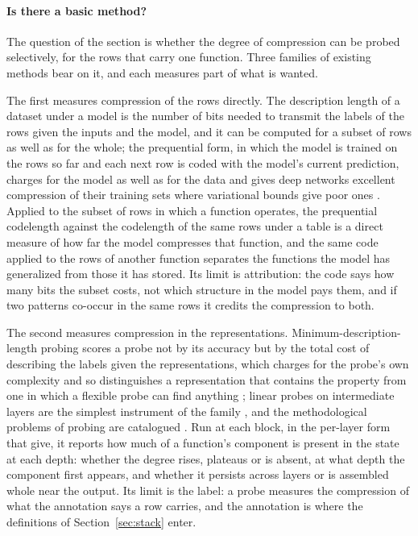\paragraph{Is there a basic method?}
The question of the section is whether the degree of compression can be probed selectively, for the
rows that carry one function. Three families of existing methods bear on it, and each measures part of
what is wanted.

The first measures compression of the rows directly. The description length of a dataset under a
model is the number of bits needed to transmit the labels of the rows given the inputs and the model,
and it can be computed for a subset of rows as well as for the whole; the prequential form, in which
the model is trained on the rows so far and each next row is coded with the model's current
prediction, charges for the model as well as for the data and gives deep networks excellent
compression of their training sets where variational bounds give poor ones \citep{blier2018}. Applied
to the subset of rows in which a function operates, the prequential codelength against the codelength
of the same rows under a table is a direct measure of how far the model compresses that function, and
the same code applied to the rows of another function separates the functions the model has
generalized from those it has stored. Its limit is attribution: the code says how many bits the
subset costs, not which structure in the model pays them, and if two patterns co-occur in the same
rows it credits the compression to both.

The second measures compression in the representations. Minimum-description-length probing scores a
probe not by its accuracy but by the total cost of describing the labels given the representations,
which charges for the probe's own complexity and so distinguishes a representation that contains the
property from one in which a flexible probe can find anything \citep{voita2020}; linear probes on
intermediate layers are the simplest instrument of the family \citep{alain2016}, and the
methodological problems of probing are catalogued \citep{belinkov2022}. Run at each block, in the
per-layer form that \citet{voita2020} give, it reports how much of a function's component is present
in the state at each depth: whether the degree rises, plateaus or is absent, at what depth the
component first appears, and whether it persists across layers or is assembled whole near the output.
Its limit is the label: a probe measures the compression of what the annotation says a row carries,
and the annotation is where the definitions of Section~\ref{sec:stack} enter.

